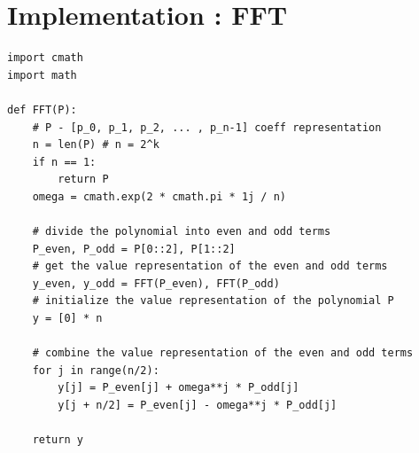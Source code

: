 \documentclass{report}
\begin{document}
\chapter{Implementation : FFT}

\begin{verbatim}
import cmath
import math

def FFT(P):
	# P - [p_0, p_1, p_2, ... , p_n-1] coeff representation
	n = len(P) # n = 2^k
	if n == 1:
		return P
	omega = cmath.exp(2 * cmath.pi * 1j / n)

	# divide the polynomial into even and odd terms
	P_even, P_odd = P[0::2], P[1::2]
	# get the value representation of the even and odd terms
	y_even, y_odd = FFT(P_even), FFT(P_odd)
	# initialize the value representation of the polynomial P
	y = [0] * n

	# combine the value representation of the even and odd terms
	for j in range(n/2):
		y[j] = P_even[j] + omega**j * P_odd[j]
		y[j + n/2] = P_even[j] - omega**j * P_odd[j]

	return y

\end{verbatim}
\end{document}
